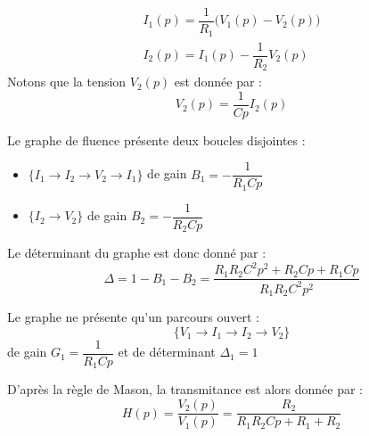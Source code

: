 \begin{align*}
    I_1(p)=\dfrac{1}{R_1}\big(V_1(p)-V_2(p)\big)\\
    I_2(p)=I_1(p)-\dfrac{1}{R_2}V_2(p)
\end{align*}
Notons que la tension $V_2(p)$ est donnée par :
\[
    V_2(p)=\dfrac{1}{Cp}I_2(p)
\]
\begin{center}
    
\end{center}
Le graphe de fluence présente deux boucles disjointes :
\begin{itemize}
    \item $\{I_1\rightarrow I_2\rightarrow V_2\rightarrow I_1\}$ 
          de gain $B_1=-\dfrac{1}{R_1Cp}$ 
    \item $\{I_2\rightarrow V_2\}$ de gain $B_2=-\dfrac{1}{R_2Cp}$ 
\end{itemize}
Le déterminant du graphe est donc donné par :
\[
    \Delta=1-B_1-B_2=\dfrac{R_1R_2C^2p^2+R_2Cp+R_1Cp}{R_1R_2C^2p^2}
\]

Le graphe ne présente qu'un parcours ouvert :
\[
    \{V_1\rightarrow I_1\rightarrow I_2\rightarrow V_2\}
\]
de gain $G_1=\dfrac{1}{R_1Cp}$ et de déterminant $\Delta_1=1$

D'après la règle de Mason, la transmitance est alors donnée par :
\[
    H(p)=\dfrac{V_2(p)}{V_1(p)}=\dfrac{R_2}{R_1R_2Cp+ R_1+R_2}
\]
